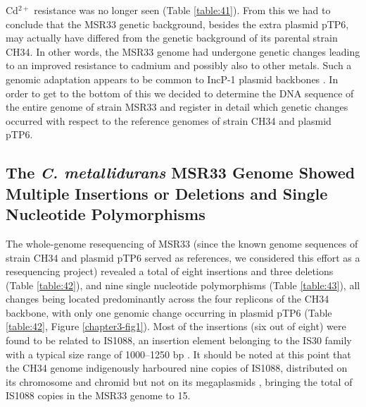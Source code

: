 Cd$^{2+}$ resistance was no longer seen (Table \ref{table:41}). From this we had to conclude that the MSR33 genetic background, besides the extra plasmid pTP6, may actually have differed from the genetic background of its parental strain CH34. In other words, the MSR33 genome had undergone genetic changes leading to an improved resistance to cadmium and possibly also to other metals. Such a genomic adaptation appears to be common to IncP-1 plasmid backbones \citep{norberg2011incp}. In order to get to the bottom of this we decided to determine the DNA sequence of the entire genome of strain MSR33 and register in detail which genetic changes occurred with respect to the reference genomes of strain CH34 and plasmid pTP6. \subsection{The 
\textit{C. metallidurans} MSR33 Genome Showed Multiple Insertions or Deletions and Single Nucleotide Polymorphisms}

The whole-genome resequencing of MSR33 (since the known genome sequences of strain CH34 and plasmid pTP6 served as references, we considered this effort as a resequencing project) revealed a total of eight insertions and three deletions (Table \ref{table:42}), and nine single nucleotide polymorphisms (Table \ref{table:43}), all changes being located predominantly across the four replicons of the CH34 backbone, with only one genomic change occurring in plasmid pTP6 (Table \ref{table:42}, Figure \ref{chapter3-fig1}). Most of the insertions (six out of eight) were found to be related to IS1088, an insertion element belonging to the IS30 family with a typical size range of 1000–1250 bp \citep{siguier2014bacterial}. It should be noted at this point that the CH34 genome indigenously harboured nine copies of IS1088, distributed on its chromosome and chromid but not on its megaplasmids \citep{janssen2010complete}, bringing the total of IS1088 copies in the MSR33 genome to 15.


